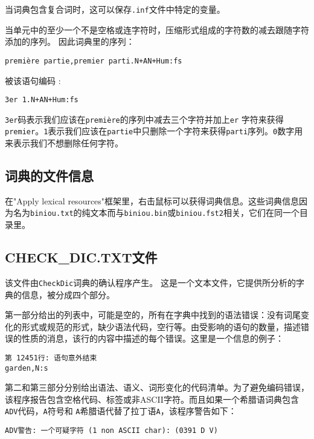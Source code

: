 \bigskip
\noindent 
当词典包含复合词时，这可以保存\verb+.inf+文件中特定的变量。




\bigskip
\noindent
当单元中的至少一个不是空格或连字符时，压缩形式组成的字符数的减去跟随字符添加的序列。
因此词典里的序列：

\bigskip
\noindent
\texttt{premi\`ere partie,premier parti.N+AN+Hum:fs}

\bigskip
\noindent 被该语句编码 :

\bigskip
\verb$3er 1.N+AN+Hum:fs$

\bigskip
\noindent
 \verb+3er+码表示我们应该在\texttt{premi\`ere}的序列中减去三个字符并加上\verb+er+ 字符来获得\verb+premier+。\verb+1+表示我们应该在\verb+partie+中只删除一个字符来获得\verb+parti+序列。\verb+0+数字用来表示我们不想删除任何字符。


\subsection{词典的文件信息}
 在"Apply lexical resources"框架里，右击鼠标可以获得词典信息。这些词典信息因为名为\verb+biniou.txt+的纯文本而与\verb+biniou.bin+或\verb+biniou.fst2+相关，它们在同一个目录里。

\subsection{ CHECK\_DIC.TXT文件}

该文件由\verb+CheckDic+词典的确认程序产生。
这是一个文本文件，它提供所分析的字典的信息，被分成四个部分。


\bigskip
\noindent
第一部分给出的列表中，可能是空的，所有在字典中找到的语法错误：没有词尾变化的形式或规范的形式，缺少语法代码，空行等。由受影响的语句的数量，描述错误的性质的消息，该行的内容中描述的每个错误。这里是一个信息的例子：

\begin{verbatim}
第 12451行: 语句意外结束
garden,N:s
\end{verbatim}

\bigskip
\noindent
第二和第三部分分别给出语法、语义、词形变化的代码清单。为了避免编码错误，该程序报告包含空格代码、标签或非ASCII字符。而且如果一个希腊语词典包含\verb+ADV+代码，\verb+A+符号和
\verb+A+希腊语代替了拉丁语\verb+A+，该程序警告如下：


\begin{verbatim}
ADV警告: 一个可疑字符 (1 non ASCII char): (0391 D V)
\end{verbatim}

